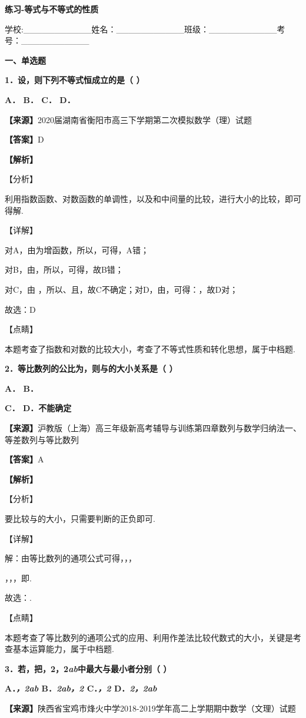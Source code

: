 \documentclass[
]{article}
\author{}
\date{}
\begin{document}
\textbf{练习-等式与不等式的性质}

学校:\_\_\_\_\_\_\_\_\_\_\_姓名：\_\_\_\_\_\_\_\_\_\_\_班级：\_\_\_\_\_\_\_\_\_\_\_考号：\_\_\_\_\_\_\_\_\_\_\_

\textbf{一、单选题}

\textbf{1．设，则下列不等式恒成立的是（ ）}

\textbf{A． B． C． D．}

\textbf{【来源】}2020届湖南省衡阳市高三下学期第二次模拟数学（理）试题

\textbf{【答案】}D

\textbf{【解析】}

【分析】

利用指数函数、对数函数的单调性，以及和中间量的比较，进行大小的比较，即可得解.

【详解】

对A，由为增函数，所以，可得，A错；

对B，由，所以，可得，故B错；

对C，由 ，所以、且，故C不确定；对D，由，可得：，故D对；

故选：D

【点睛】

本题考查了指数和对数的比较大小，考查了不等式性质和转化思想，属于中档题.

\textbf{2．等比数列的公比为，则与的大小关系是（ ）}

\textbf{A． B．}

\textbf{C． D．不能确定}

\textbf{【来源】}沪教版（上海）高三年级新高考辅导与训练第四章数列与数学归纳法一、等差数列与等比数列

\textbf{【答案】}A

\textbf{【解析】}

【分析】

要比较与的大小，只需要判断的正负即可.

【详解】

解：由等比数列的通项公式可得，，，

，，，即.

故选：.

【点睛】

本题考查了等比数列的通项公式的应用、利用作差法比较代数式的大小，关键是考查基本运算能力，属于中档题.

\textbf{3．若，把，2，2\emph{ab}中最大与最小者分别（ ）}

\textbf{A．\emph{，2ab} B．\emph{2ab，2} C．\emph{，2} D．\emph{2，2ab}}

\textbf{【来源】}陕西省宝鸡市烽火中学2018-2019学年高二上学期期中数学（文理）试题
\end{document}
